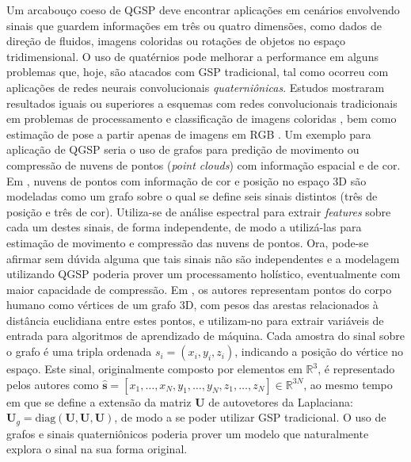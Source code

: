 
Um arcabou\c co coeso de QGSP deve encontrar aplica\c c\~oes em cen\'arios envolvendo sinais que guardem informa\c c\~oes em tr\^es ou quatro dimens\~oes, como dados de dire\c c\~ao de fluidos, imagens coloridas ou rota\c c\~oes de objetos no espa\c co tridimensional. O uso de quat\'ernios pode melhorar a performance em alguns problemas que, hoje, s\~ao atacados com GSP tradicional, tal como ocorreu com aplica\c c\~oes de redes neurais convolucionais \emph{quaterni\^onicas}. Estudos mostraram resultados iguais ou superiores a esquemas com redes convolucionais tradicionais em problemas de processamento e classifica\c c\~ao de imagens coloridas \cite{yin2019quaternion, parcollet2019quaternion}, bem como estima\c c\~ao de pose a partir apenas de imagens em RGB \cite{hsu2018quatnet}. Um exemplo para aplica\c c\~ao de QGSP seria o uso de grafos para predi\c c\~ao de movimento ou compress\~ao de nuvens de pontos (\textit{point clouds}) com informa\c c\~ao espacial e de cor. Em \cite{thanou2016graph}, nuvens de pontos com informa\c c\~ao de cor e posi\c c\~ao no espa\c co 3D s\~ao modeladas como um grafo sobre o qual se define seis sinais distintos (tr\^es de posi\c c\~ao e tr\^es de cor). Utiliza-se de an\'alise espectral para extrair \emph{features} sobre cada um destes sinais, de forma independente, de modo a utiliz\'a-las para estima\c c\~ao de movimento e compress\~ao das nuvens de pontos. Ora, pode-se afirmar sem d\'uvida alguma que tais sinais n\~ao s\~ao independentes e a modelagem utilizando QGSP poderia prover um processamento hol\'istico, eventualmente com maior capacidade de compress\~ao. Em \cite{batabyal2015ugrasp}, os autores representam pontos do corpo humano como v\'ertices de um grafo 3D, com pesos das arestas relacionados \`a dist\^ancia euclidiana entre estes pontos, e utilizam-no para extrair vari\'aveis de entrada para algoritmos de aprendizado de m\'aquina. Cada amostra do sinal sobre o grafo \'e uma tripla ordenada $ s_i = (x_i, y_i, z_i) $, indicando a posi\c c\~ao do v\'ertice no espa\c co. Este sinal, originalmente composto por elementos em $ \mathbb{R}^3 $, \'e representado pelos autores como $ \hat{\mathbf{s}} = [x_1, \dots, x_N, y_1, \dots, y_N, z_1, \dots, z_N] \in \mathbb{R}^{3N}$, ao mesmo tempo em que se define a extens\~ao da matriz $ \mathbf{U} $ de autovetores da Laplaciana: $ \mathbf{U}_g = \text{diag}(\mathbf{U}, \mathbf{U}, \mathbf{U}) $, de modo a se poder utilizar GSP tradicional. O uso de grafos e sinais quaterni\^onicos poderia prover um modelo que naturalmente explora o sinal na sua forma original.



